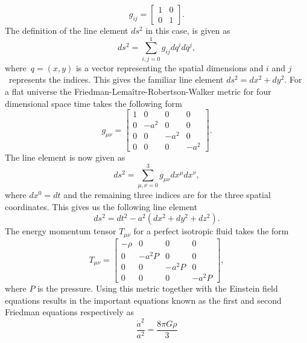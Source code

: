 \begin{equation}
    g_{ij}=
    \begin{bmatrix}
        1 & 0 \\
        0 & 1 
    \end{bmatrix}.
\end{equation}
The definition of the line element $ds^2$ in this case, is given as
\begin{equation}
    ds^2 = \sum_{i,j=0}^1g_{ij}dq^idq^j,
\end{equation}
where $q=(x, y)$ is a vector representing the spatial dimensions and $i$ and $j$ represents the indices.
This gives the familiar line element $ds^2=dx^2+dy^2$.
For a flat universe the Friedman-Lemaître-Robertson-Walker metric for four dimensional space time takes the following form
\begin{equation}
    g_{\mu\nu}=
    \begin{bmatrix}
        1 & 0 & 0 & 0\\
        0 & -a^2 & 0 & 0\\
        0 & 0 & -a^2 & 0\\
        0 & 0 & 0 & -a^2 
    \end{bmatrix}.
\end{equation}
The line element is now given as 
\begin{equation}
    ds^2 = \sum_{\mu,\nu=0}^3g_{\mu\nu}dx^\mu dx^\nu,
\end{equation}
where $dx^0=dt$ and the remaining three indices are for the three spatial coordinates.
This gives us the following line element
\begin{equation}
    ds^2 = dt^2 -a^2(dx^2 + dy^2 + dz^2).
\end{equation}
The energy momentum tensor $T_{\mu\nu}$ for a perfect isotropic fluid takes the
form
\begin{equation}
    T_{\mu\nu}=
    \begin{bmatrix}
        -\rho & 0 & 0 & 0\\
        0 & -a^2P & 0 & 0\\
        0 & 0 & -a^2P & 0\\
        0 & 0 & 0 & -a^2P 
    \end{bmatrix},
\end{equation}
where $P$ is the pressure.
Using this metric together with the Einstein field equations results in the important
equations known as the first and second Friedman equations respectively as
\begin{equation}\label{eq:F1}
    \frac{\dot{a}^2}{a^2} = \frac{8\pi G\rho}{3}
\end{equation}
